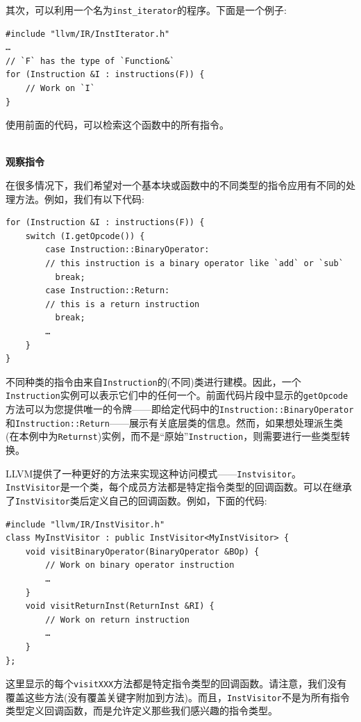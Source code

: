 其次，可以利用一个名为\texttt{inst\_iterator}的程序。下面是一个例子:

\begin{lstlisting}[style=styleCXX]
#include "llvm/IR/InstIterator.h"
…
// `F` has the type of `Function&`
for (Instruction &I : instructions(F)) {
	// Work on `I`
}
\end{lstlisting}

使用前面的代码，可以检索这个函数中的所有指令。

\hspace*{\fill} \\ %
\noindent
\textbf{观察指令}

在很多情况下，我们希望对一个基本块或函数中的不同类型的指令应用有不同的处理方法。例如，我们有以下代码:

\begin{lstlisting}[style=styleCXX]
for (Instruction &I : instructions(F)) {
	switch (I.getOpcode()) {
		case Instruction::BinaryOperator:
		// this instruction is a binary operator like `add` or `sub`
		  break;
		case Instruction::Return:
		// this is a return instruction
		  break;
		…
	}
}
\end{lstlisting}

不同种类的指令由来自\texttt{Instruction}的(不同)类进行建模。因此，一个\texttt{Instruction}实例可以表示它们中的任何一个。前面代码片段中显示的\texttt{getOpcode}方法可以为您提供唯一的令牌——即给定代码中的\texttt{Instruction::BinaryOperator}和\texttt{Instruction::Return}——展示有关底层类的信息。然而，如果想处理派生类(在本例中为\texttt{Returnst})实例，而不是“原始”\texttt{Instruction}，则需要进行一些类型转换。

LLVM提供了一种更好的方法来实现这种访问模式——\texttt{Instvisitor}。\texttt{InstVisitor}是一个类，每个成员方法都是特定指令类型的回调函数。可以在继承了\texttt{InstVisitor}类后定义自己的回调函数。例如，下面的代码:

\begin{lstlisting}[style=styleCXX]
#include "llvm/IR/InstVisitor.h"
class MyInstVisitor : public InstVisitor<MyInstVisitor> {
	void visitBinaryOperator(BinaryOperator &BOp) {
		// Work on binary operator instruction
		…
	}
	void visitReturnInst(ReturnInst &RI) {
		// Work on return instruction
		…
	}
};
\end{lstlisting}

这里显示的每个\texttt{visitXXX}方法都是特定指令类型的回调函数。请注意，我们没有覆盖这些方法(没有覆盖关键字附加到方法)。而且，\texttt{InstVisitor}不是为所有指令类型定义回调函数，而是允许定义那些我们感兴趣的指令类型。

